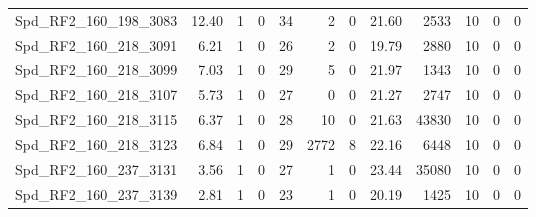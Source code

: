 \begin{longtable}[c]{@{}lrrrrrrrrrrr@{}}
Spd\_RF2\_160\_198\_3083     & 12.40                  & 1                       & 0                       & 34                     & 2                       & 0                       & 21.60                   & 2533                     & 10                       & 0                        & 0                        \\
Spd\_RF2\_160\_218\_3091     & 6.21                   & 1                       & 0                       & 26                     & 2                       & 0                       & 19.79                   & 2880                     & 10                       & 0                        & 0                        \\
Spd\_RF2\_160\_218\_3099     & 7.03                   & 1                       & 0                       & 29                     & 5                       & 0                       & 21.97                   & 1343                     & 10                       & 0                        & 0                        \\
Spd\_RF2\_160\_218\_3107     & 5.73                   & 1                       & 0                       & 27                     & 0                       & 0                       & 21.27                   & 2747                     & 10                       & 0                        & 0                        \\
Spd\_RF2\_160\_218\_3115     & 6.37                   & 1                       & 0                       & 28                     & 10                      & 0                       & 21.63                   & 43830                    & 10                       & 0                        & 0                        \\
Spd\_RF2\_160\_218\_3123     & 6.84                   & 1                       & 0                       & 29                     & 2772                    & 8                       & 22.16                   & 6448                     & 10                       & 0                        & 0                        \\
Spd\_RF2\_160\_237\_3131     & 3.56                   & 1                       & 0                       & 27                     & 1                       & 0                       & 23.44                   & 35080                    & 10                       & 0                        & 0                        \\
Spd\_RF2\_160\_237\_3139     & 2.81                   & 1                       & 0                       & 23                     & 1                       & 0                       & 20.19                   & 1425                     & 10                       & 0                        & 0                        \\

\end{longtable}
